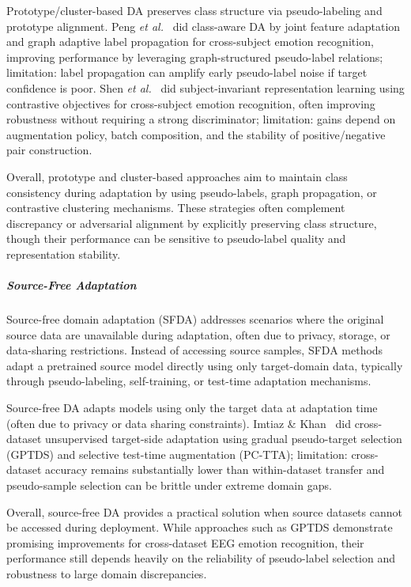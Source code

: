\documentclass{WileyMSP-template}
\begin{document}
Prototype/cluster-based DA preserves class structure via pseudo-labeling and prototype alignment. Peng \textit{et al.}~\cite{peng2022jfaglp} did class-aware DA by joint feature adaptation and graph adaptive label propagation for cross-subject emotion recognition, improving performance by leveraging graph-structured pseudo-label relations; limitation: label propagation can amplify early pseudo-label noise if target confidence is poor. Shen \textit{et al.}~\cite{shen2022contrastive} did subject-invariant representation learning using contrastive objectives for cross-subject emotion recognition, often improving robustness without requiring a strong discriminator; limitation: gains depend on augmentation policy, batch composition, and the stability of positive/negative pair construction.

Overall, prototype and cluster-based approaches aim to maintain class consistency during adaptation by using pseudo-labels, graph propagation, or contrastive clustering mechanisms. These strategies often complement discrepancy or adversarial alignment by explicitly preserving class structure, though their performance can be sensitive to pseudo-label quality and representation stability.

\subparagraph{Source-Free Adaptation}
Source-free domain adaptation (SFDA) addresses scenarios where the original source data are unavailable during adaptation, often due to privacy, storage, or data-sharing restrictions. Instead of accessing source samples, SFDA methods adapt a pretrained source model directly using only target-domain data, typically through pseudo-labeling, self-training, or test-time adaptation mechanisms.

Source-free DA adapts models using only the target data at adaptation time (often due to privacy or data sharing constraints). Imtiaz \& Khan~\cite{imtiaz2025compbiomed_uda_gptds} did cross-dataset unsupervised target-side adaptation using gradual pseudo-target selection (GPTDS) and selective test-time augmentation (PC-TTA); limitation: cross-dataset accuracy remains substantially lower than within-dataset transfer and pseudo-sample selection can be brittle under extreme domain gaps.

Overall, source-free DA provides a practical solution when source datasets cannot be accessed during deployment. While approaches such as GPTDS demonstrate promising improvements for cross-dataset EEG emotion recognition, their performance still depends heavily on the reliability of pseudo-label selection and robustness to large domain discrepancies.
\end{document}
